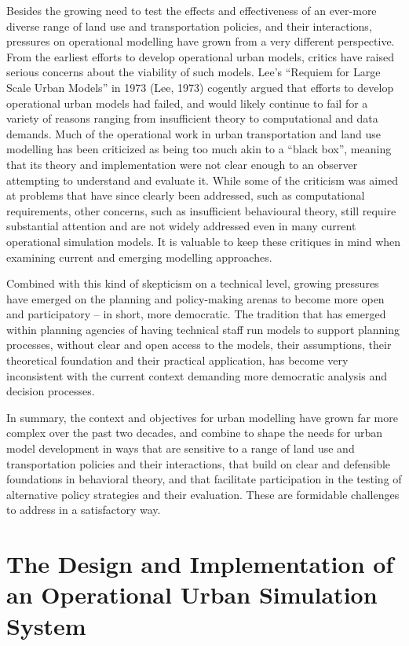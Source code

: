 Besides the growing need to test the effects and effectiveness of an ever-more diverse range of land use and transportation policies, and their interactions, pressures on operational modelling have grown from a very different perspective.  From the earliest efforts to develop operational urban models, critics have raised serious concerns about the viability of such models.  Lee's ``Requiem for Large Scale Urban Models'' in 1973 (Lee, 1973) cogently argued that efforts to develop operational urban models had failed, and would likely continue to fail for a variety of reasons ranging from insufficient theory to computational and data demands.  Much of the operational work in urban transportation and land use modelling has been criticized as being too much akin to a ``black box'', meaning that its theory and implementation were not clear enough to an observer attempting to understand and evaluate it.  While some of the criticism was aimed at problems that have since clearly been addressed, such as computational requirements, other concerns, such as insufficient behavioural theory, still require substantial attention and are not widely addressed even in many current operational simulation models.  It is valuable to keep these critiques in mind when examining current and emerging modelling approaches.

Combined with this kind of skepticism on a technical level, growing pressures have emerged on the planning and policy-making arenas to become more open and participatory -- in short, more democratic.  The tradition that has emerged within planning agencies of having technical staff run models to support planning processes, without clear and open access to the models, their assumptions, their theoretical foundation and their practical application, has become very inconsistent with the current context demanding more democratic analysis and decision processes.

In summary, the context and objectives for urban modelling have grown far more complex over the past two decades, and combine to shape the needs for urban model development in ways that are sensitive to a range of land use and transportation policies and their interactions, that build on clear and defensible foundations in behavioral theory, and that facilitate participation in the testing of alternative policy strategies and their evaluation.  These are formidable challenges to address in a satisfactory way.


\section{The Design and Implementation of an Operational Urban Simulation System}

